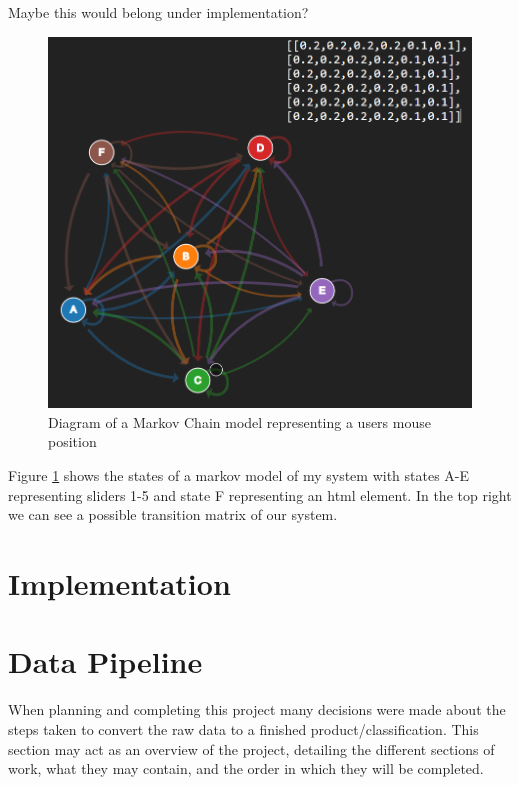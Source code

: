 \documentclass{article}
\begin{document}
Maybe this would belong under implementation?
\begin{figure}[ht]
    \centering
    \includegraphics[scale=0.55]{HMM-Example-Diagram.png}
    \caption{Diagram of a Markov Chain model representing a users mouse position}
    \label{fig:Markov}
\end{figure}

Figure \ref{fig:Markov} shows the states of a markov model of my system with states A-E representing sliders 1-5 and state F representing an html element.
In the top right we can see a possible transition matrix of our system.

\section{Implementation}


\section{Data Pipeline}

When planning and completing this project many decisions were made about the steps taken to convert the raw data to a finished product/classification.
This section may act as an overview of the project, detailing the different sections of work, what they may contain, and the order in which they will be completed.
\end{document}
